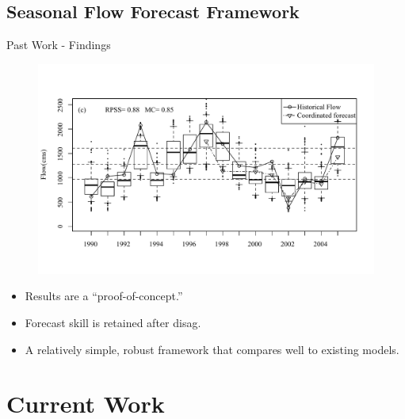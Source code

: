 \documentclass[compress]{beamer}
\begin{document}
\subsection{Seasonal Flow Forecast Framework}
\begin{frame}{Past Work - Findings}
%

\begin{figure}[htbp]
   \centering
   \includegraphics[width=.9\textwidth]{figs/figure-9b.pdf} 
\end{figure}


\begin{itemize}
\item Results are a ``proof-of-concept.''
\item Forecast skill is retained after disag.
\item A relatively simple, robust framework that compares well to existing models.
\end{itemize}

\end{frame}

\section{Current Work}
\end{document}
